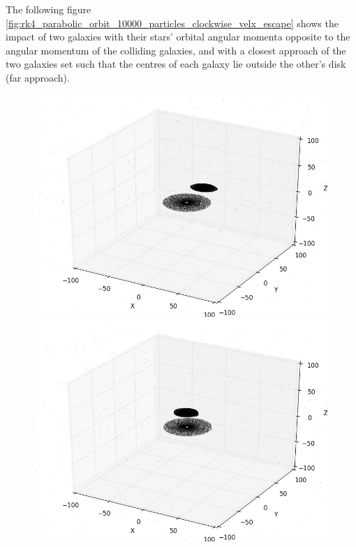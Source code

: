 \documentclass[10pt,letterpaper]{article}
\begin{document}
The following figure \ref{fig:rk4_parabolic_orbit_10000_particles_clockwise_velx_escape} shows the impact of two galaxies with their stars' orbital angular momenta opposite to the angular momentum of the colliding galaxies, and with a closest approach of the two galaxies set such that the centres of each galaxy lie outside the other's disk (far approach).\\

\begin{figure}[!htb]
  \includegraphics[width=\linewidth]{figures/galaxy_collisions/rk4_parabolic_orbit_10000_particles_clockwise_velx_escape_fig1.png}
  \subcaption{}\label{fig:rk4_parabolic_orbit_10000_particles_clockwise_velx_escape_fig1}
\endminipage\hfill
{}
  \includegraphics[width=\linewidth]{figures/galaxy_collisions/rk4_parabolic_orbit_10000_particles_clockwise_velx_escape_fig2.png}

\end{figure}
\end{document}

